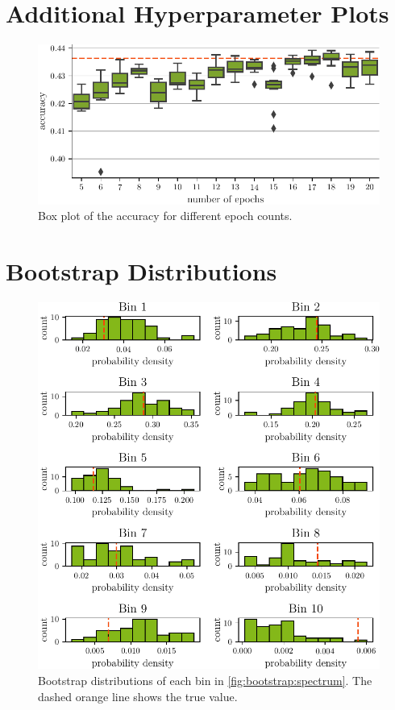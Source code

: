 \clearpage
\section{Additional Hyperparameter Plots}
\begin{figure}
  \centering
  \includegraphics[scale=1]{content/plots/hyperparam/num_epochs_vs_accuracy_boxplot_lessheight.pdf}
  \caption{Box plot of the accuracy for different epoch counts.}
  \label{fig:hyperparameter:num_epochs_vs_wd_boxplot}
\end{figure}


\clearpage
\section{Bootstrap Distributions}
\begin{figure}
  \centering
  \includegraphics[scale=1]{content/plots/bootstrap:distributions_doubleheight.pdf}
  \caption{
    Bootstrap distributions of each bin in \autoref{fig:bootstrap:spectrum}.
    The dashed orange line shows the true value.
  }
  \label{fig:bootstrap:distributions}
\end{figure}


